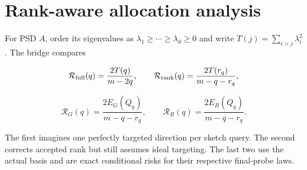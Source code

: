 \section{Rank-aware allocation analysis}\label{sec:allocation}
For PSD $A$, order its eigenvalues as $\lambda_1\ge\cdots\ge\lambda_d\ge0$ and write $T(j)=\sum_{i>j}\lambda_i^2$. The bridge compares


\begin{equation}
\mathcal R_{\rm full}(q)=\frac{2T(q)}{m-2q},\qquad
\mathcal R_{\rm rank}(q)=\frac{2T(r_q)}{m-q-r_q},
\end{equation}


\begin{equation}
\mathcal R_G(q)=\frac{2E_G(Q_q)}{m-q-r_q},\qquad
\mathcal R_R(q)=\frac{2E_R(Q_q)}{m-q-r_q}.
\end{equation}


The first imagines one perfectly targeted direction per sketch query. The second corrects accepted rank but still assumes ideal targeting. The last two use the actual basis and are exact conditional risks for their respective final-probe laws.


